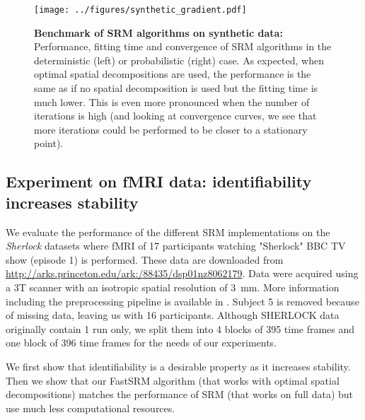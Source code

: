 \documentclass{article}
\begin{document}
\begin{figure}
  \centering
  \texttt{[image: ../figures/synthetic\_gradient.pdf]}
  \caption{\textbf{Benchmark of SRM algorithms on synthetic data: } Performance,
    fitting time and convergence of SRM algorithms in the deterministic (left)
    or probabilistic (right) case.
    As expected, when optimal spatial decompositions are used,
    the performance is the same as if no spatial decomposition is used but the fitting time is
    much lower.
    This is even more pronounced when the number of iterations is
    high (and looking at convergence curves, we see that more iterations could
    be performed to be closer to a stationary point).
  }
  \label{fig:srm:synthetic_gradient}
\end{figure}

\subsection{Experiment on fMRI data: identifiability increases stability}
We evaluate the performance of the different SRM implementations on the
\emph{Sherlock} datasets where fMRI of 17 participants watching "Sherlock" BBC
TV show (episode 1) is performed.
%
% 
These data are downloaded from
\url{http://arks.princeton.edu/ark:/88435/dsp01nz8062179}.
%
% 
Data were acquired using a 3T scanner with an isotropic spatial resolution of
3~mm.
%
% 
More information including the preprocessing pipeline is available in
\cite{sherlock}.
%
% 
Subject 5 is removed because of missing data, leaving us with 16 participants.
%
Although SHERLOCK data originally contain 1 run only, we split them into 4 blocks
of 395 time frames and one block of 396 time frames for the needs of our
experiments.
%



We first show that identifiability is a desirable property as it increases
stability.
%
Then we show that our FastSRM algorithm (that works with optimal spatial decompositions)
matches the performance of SRM (that works on full data) but use much less
computational resources.
%
\end{document}

